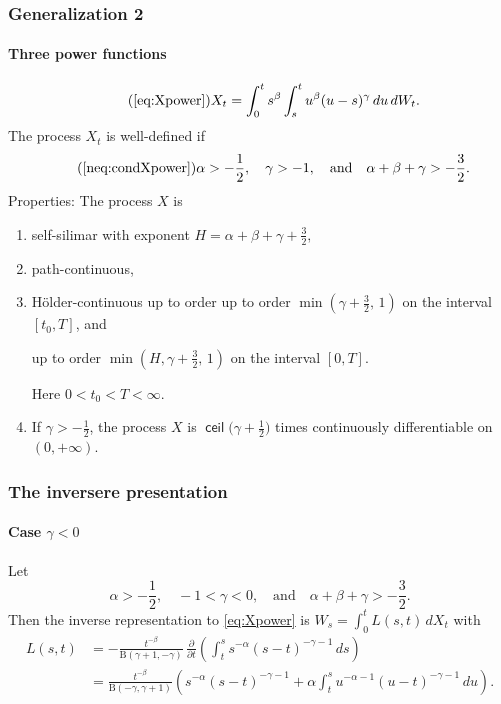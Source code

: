 \documentclass{beamer}
\DeclareMathOperator{\ceil}{\mathsf{ceil}}
\theoremstyle{plain}
\theoremstyle{definition}
\theoremstyle{remark}
\begin{document}
\begin{frame}
	\frametitle{Generalization 2}
	\framesubtitle{Three power functions}
\begin{equation}\tag{\ref{eq:Xpower}}
X_t = \int_0^t s^\beta \int_s^t u^\beta (u-s)^\gamma \,  du \, dW_t.
\end{equation}
The process $X_t$ is well-defined if
\begin{equation}\tag{\ref{neq:condXpower}}
\alpha>-\frac12, \quad \gamma>-1, \quad
\mbox{and} \quad
\alpha+\beta+\gamma>-\frac32.
\end{equation}
Properties: The process $X$ is
\begin{enumerate}
\item self-silimar with exponent
$H = \alpha+\beta+\gamma+\frac32 ,$
\item<0> path-continuous,
\item H\"older-continuous up to order
up to order $\min(\gamma+\frac32, \, 1)$
on the interval $[t_0, T]$,
and

up to order $\min(H, \gamma+\frac32, \, 1)$
on the interval $[0, T]$.

Here $0<t_0<T<\infty$.
\item<0>
If $\gamma>-\frac12$, the process $X$ is
$\ceil\bigl(\gamma+\frac12\bigr)$ times
continuously differentiable on $(0,+\infty)$.
\end{enumerate}
\end{frame}

\begin{frame}
\frametitle{The inversere presentation}
\framesubtitle{Case $\gamma<0$}
Let
\[
\alpha>-\frac12, \quad -1<\gamma<0,
\quad \mbox{and}
\quad \alpha+\beta+\gamma > -\frac32.
\]
Then the inverse representation to \eqref{eq:Xpower}
is
$\displaystyle W_s = \int_0^t L(s,t) \, dX_t$
with
\begin{align*}
L(s,t) &=
- \frac{t^{-\beta}}{\mathrm{B}(\gamma{+}1, {-}\gamma)} \,
\frac{\partial}{\partial t}\!
\left( \int_t^s s^{-\alpha} (s-t)^{-\gamma-1} \, ds \right)
\\ &=
 \frac{t^{-\beta}}{\mathrm{B}(-\gamma, \gamma{+}1)}
\left(s^{-\alpha} (s{-}t)^{-\gamma-1}
+ \alpha \int_t^s u^{-\alpha-1} (u{-}t)^{-\gamma-1} \,du \right).
\end{align*}
\end{frame}
\end{document}
